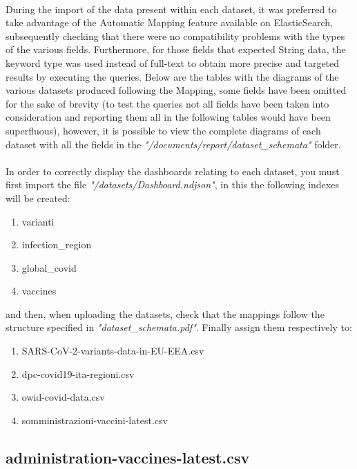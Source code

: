 \documentclass[a4paper,12pt]{article}
\begin{document}
\paragraph{} During the import of the data present within each dataset, it was preferred to take advantage of the Automatic Mapping feature available on ElasticSearch, subsequently checking that there were no compatibility problems with the types of the various fields. Furthermore, for those fields that expected String data, the keyword type was used instead of full-text to obtain more precise and targeted results by executing the queries. Below are the tables with the diagrams of the various datasets produced following the Mapping, some fields have been omitted for the sake of brevity (to test the queries not all fields have been taken into consideration and reporting them all in the following tables would have been superfluous), however, it is possible to view the complete diagrams of each dataset with all the fields in the \emph{"/documents/report/dataset\_schemata"} folder.
\paragraph{} In order to correctly display the dashboards relating to each dataset, you must first import the file \emph{"/datasets/Dashboard.ndjson"}, in this the following indexes will be created:
  \begin{enumerate}[noitemsep]
    \item varianti
    \item infection\_region
    \item global\_covid
    \item vaccines
   \end{enumerate}
and then, when uploading the datasets, check that the mappings follow the structure specified in \emph{"dataset\_schemata.pdf"}. Finally assign them respectively to:
  \begin{enumerate}[noitemsep]
    \item SARS-CoV-2-variants-data-in-EU-EEA.csv
    \item dpc-covid19-ita-regioni.csv
    \item owid-covid-data.csv
    \item somministrazioni-vaccini-latest.csv
   \end{enumerate}
\newpage
   
\subsection{administration-vaccines-latest.csv}
\end{document}
